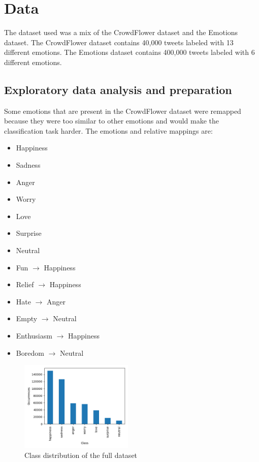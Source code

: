 \section{Data}
\label{sec:data}
The dataset used was a mix of the CrowdFlower 
dataset\cite{crowdflower_dataset} and the
Emotions dataset\cite{emotions_dataset}.
The CrowdFlower dataset contains 40,000 tweets
labeled with 13 different emotions. The Emotions 
dataset contains 400,000 tweets labeled with 6 
different emotions.

\subsection{Exploratory data analysis and preparation}
Some emotions that are present in the
CrowdFlower dataset were remapped because they
were too similar to other emotions and 
would make the classification task harder.
The emotions and relative mappings are:
\begin{itemize}
    \item Happiness
    \item Sadness
    \item Anger
    \item Worry
    \item Love
    \item Surprise
    \item Neutral
    \item Fun $\rightarrow$ Happiness
    \item Relief $\rightarrow$ Happiness
    \item Hate $\rightarrow$ Anger
    \item Empty $\rightarrow$ Neutral
    \item Enthusiasm $\rightarrow$ Happiness
    \item Boredom $\rightarrow$ Neutral
\end{itemize}

\begin{figure}[H]
    \centering
    \includegraphics[width=0.48\textwidth]{images/class_distribution.png}
    \caption{Class distribution of the full dataset}
    \label{fig:class_distribution}
\end{figure}

